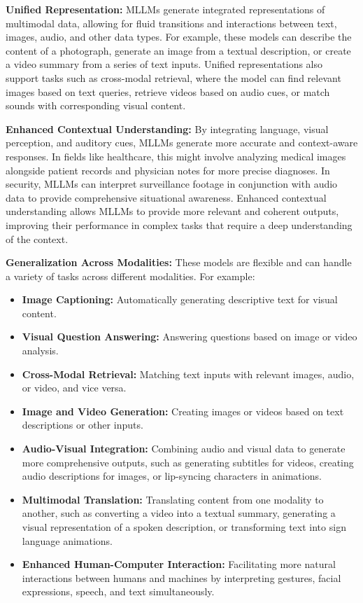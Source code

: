 \textbf{Unified Representation:} MLLMs generate integrated representations of multimodal data, allowing for fluid transitions and interactions between text, images, audio, and other data types. For example, these models can describe the content of a photograph, generate an image from a textual description, or create a video summary from a series of text inputs. Unified representations also support tasks such as cross-modal retrieval, where the model can find relevant images based on text queries, retrieve videos based on audio cues, or match sounds with corresponding visual content.

\textbf{Enhanced Contextual Understanding:} By integrating language, visual perception, and auditory cues, MLLMs generate more accurate and context-aware responses. In fields like healthcare, this might involve analyzing medical images alongside patient records and physician notes for more precise diagnoses. In security, MLLMs can interpret surveillance footage in conjunction with audio data to provide comprehensive situational awareness. Enhanced contextual understanding allows MLLMs to provide more relevant and coherent outputs, improving their performance in complex tasks that require a deep understanding of the context.

\textbf{Generalization Across Modalities:} These models are flexible and can handle a variety of tasks across different modalities. For example:

\begin{itemize}
    \item \textbf{Image Captioning:} Automatically generating descriptive text for visual content.
    \item \textbf{Visual Question Answering:} Answering questions based on image or video analysis.
    \item \textbf{Cross-Modal Retrieval:} Matching text inputs with relevant images, audio, or video, and vice versa.
    \item \textbf{Image and Video Generation:} Creating images or videos based on text descriptions or other inputs.
    \item \textbf{Audio-Visual Integration:} Combining audio and visual data to generate more comprehensive outputs, such as generating subtitles for videos, creating audio descriptions for images, or lip-syncing characters in animations.
    \item \textbf{Multimodal Translation:} Translating content from one modality to another, such as converting a video into a textual summary, generating a visual representation of a spoken description, or transforming text into sign language animations.
    \item \textbf{Enhanced Human-Computer Interaction:} Facilitating more natural interactions between humans and machines by interpreting gestures, facial expressions, speech, and text simultaneously.
\end{itemize}

